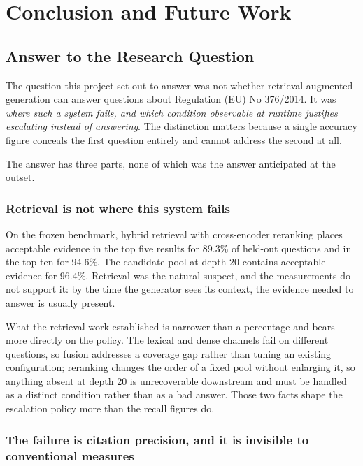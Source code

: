 \chapter[Conclusion]{Conclusion and Future Work}
\label{chap:conclusion}

\section{Answer to the Research Question}

The question this project set out to answer was not whether retrieval-augmented
generation can answer questions about Regulation (EU) No 376/2014. It was
\emph{where such a system fails, and which condition observable at runtime
justifies escalating instead of answering}. The distinction matters because a
single accuracy figure conceals the first question entirely and cannot address
the second at all.

The answer has three parts, none of which was the answer anticipated at the
outset.

\subsection{Retrieval is not where this system fails}

On the frozen benchmark, hybrid retrieval with cross-encoder reranking places
acceptable evidence in the top five results for 89.3\% of held-out questions and
in the top ten for 94.6\%. The candidate pool at depth 20 contains acceptable
evidence for 96.4\%. Retrieval was the natural suspect, and the measurements do not support it:
by the time the generator sees its context, the evidence needed to answer is
usually present.

What the retrieval work established is narrower than a percentage and bears
more directly on the policy. The lexical and dense channels fail on different questions, so fusion addresses a coverage gap rather than tuning an existing
configuration; reranking changes the order of a fixed
pool without enlarging it, so anything absent at depth 20 is unrecoverable
downstream and must be handled as a distinct condition rather than as a bad
answer. Those two facts shape the escalation policy more than the recall figures
do.

\subsection{The failure is citation precision, and it is invisible to
conventional measures}

